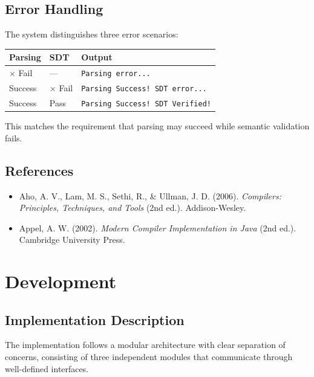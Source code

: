 \documentclass[letterpaper,12pt,oneside]{article}
\begin{document}
	\subsection{Error Handling}
	
	The system distinguishes three error scenarios:
	
	\begin{table}[h]
		\centering
		\begin{tabular}{|l|l|l|}
			\hline
			\textbf{Parsing} & \textbf{SDT} & \textbf{Output} \\
			\hline
			$\times$ Fail & — & \texttt{Parsing error...} \\
			\checkmark Success & $\times$ Fail & \texttt{Parsing Success! SDT error...} \\
			\checkmark Success & \checkmark Pass & \texttt{Parsing Success! SDT Verified!} \\
			\hline
		\end{tabular}
	\end{table}
	
	This matches the requirement that parsing may succeed while semantic validation fails.
	
	\subsection{References}
	
	\begin{itemize}
		\item Aho, A. V., Lam, M. S., Sethi, R., \& Ullman, J. D. (2006). \textit{Compilers: Principles, Techniques, and Tools} (2nd ed.). Addison-Wesley.
		\item Appel, A. W. (2002). \textit{Modern Compiler Implementation in Java} (2nd ed.). Cambridge University Press.
	\end{itemize}

\section{Development}

\subsection{Implementation Description}

The implementation follows a modular architecture with clear separation of concerns, consisting of three independent modules that communicate through well-defined interfaces.
\end{document}
